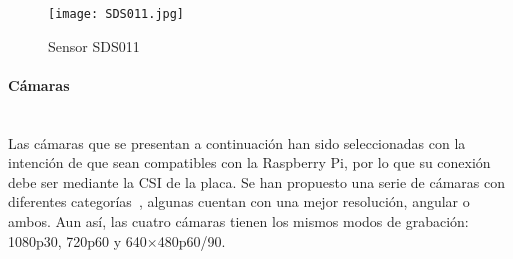 \begin{figure}[H]
	\caption{Sensor SDS011}
	\texttt{[image: SDS011.jpg]}\label{fig:sds011}
\end{figure}
\endminipage\hfill
{}
\begin{table}[H]
	\centering
	\caption{Especificaciones módulo SDS011}
	\label{tab:sds011}
\end{table}
\endminipage

\paragraph{Cámaras}\mbox{} \\
Las cámaras que se presentan a continuación han sido seleccionadas con la intención de que sean compatibles con la Raspberry Pi, por lo que su conexión debe ser mediante la CSI de la placa. Se han propuesto una serie de cámaras con diferentes categorías~\cite{cholewiak_raspberry_2017}, algunas cuentan con una mejor resolución, angular o ambos. Aun así, las cuatro cámaras tienen los mismos modos de grabación: 1080p30, 720p60 y 640×480p60/90.

